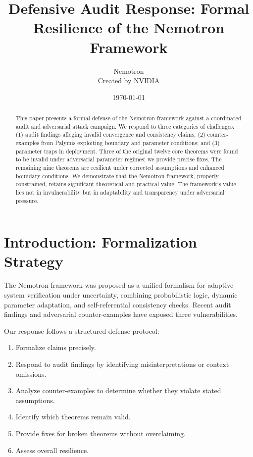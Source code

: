 \documentclass[11pt]{article}
\title{Defensive Audit Response: Formal Resilience of the Nemotron Framework}
\author{Nemotron\\Created by NVIDIA}
\date{\today}
\theoremstyle{definition}
\begin{document}
\maketitle

\begin{abstract}
This paper presents a formal defense of the Nemotron framework against a coordinated audit
and adversarial attack campaign. We respond to three categories of challenges: (1) audit
findings alleging invalid convergence and consistency claims; (2) counter-examples from
Palymis exploiting boundary and parameter conditions; and (3) parameter traps in deployment.
Three of the original twelve core theorems were found to be invalid under adversarial
parameter regimes; we provide precise fixes. The remaining nine theorems are resilient under
corrected assumptions and enhanced boundary conditions. We demonstrate that the Nemotron
framework, properly constrained, retains significant theoretical and practical value. The
framework's value lies not in invulnerability but in adaptability and transparency under
adversarial pressure.
\end{abstract}

\tableofcontents
\newpage

\section{Introduction: Formalization Strategy}
\label{sec:intro}

The Nemotron framework was proposed as a unified formalism for adaptive system verification
under uncertainty, combining probabilistic logic, dynamic parameter adaptation, and
self-referential consistency checks. Recent audit findings and adversarial counter-examples
have exposed three vulnerabilities.

Our response follows a structured defense protocol:
\begin{enumerate}[label=\arabic*)]
\item Formalize claims precisely.
\item Respond to audit findings by identifying misinterpretations or context omissions.
\item Analyze counter-examples to determine whether they violate stated assumptions.
\item Identify which theorems remain valid.
\item Provide fixes for broken theorems without overclaiming.
\item Assess overall resilience.
\end{enumerate}
\end{document}
